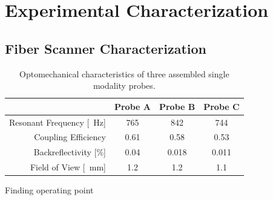 %
%
\chapter{Experimental Characterization}
\label{Ch:Measurements}	



\section{Fiber Scanner Characterization}

\begin{table}[h!]\centering
\begin{tabular}{rccc}
& \textbf{Probe A} & \textbf{Probe B} & \textbf{Probe C} \\ 
\hline
Resonant Frequency [\SI{}{\hertz}] & 765 & 842 & 744 \\ 
Coupling Efficiency & 0.61 & 0.58 & 0.53 \\ 
Backreflectivity [\%]& 0.04 & 0.018 & 0.011 \\ 
Field of View [\SI{}{\milli\meter}]& 1.2 & 1.2 & 1.1 \\ 
\end{tabular} 
\caption{Optomechanical characteristics of three assembled single modality probes.}
    \label{tab:simRes}
\end{table}

Finding operating point\cite{Fertis2006}


%
%
%





